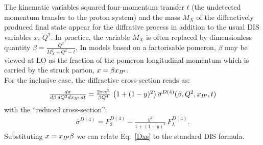 The kinematic variables squared four-momentum transfer $t$
(the undetected momentum transfer to the proton system) and
the mass $M_X$ of the diffractively produced final state 
appear for the diffrative process in addition to the usual DIS variables $x$, $Q^2$.
In practice, the variable $M_X$ 
is often replaced by dimensionless quantity $\beta=\frac{Q^2}{M_X^2+Q^2-t}$.
%
In models based on a factorisable pomeron, $\beta$ may be viewed at LO as the fraction of the
pomeron longitudinal momentum which is carried by the struck parton, $x=\beta x_{{I\!P}}$.
\\
For the inclusive case, the diffractive cross-section reads as:
\begin{equation}
\begin{array}{lcl}
  \frac{d\sigma}{d\beta\,dQ^2dx_{{I\!P}}\,dt}
=
  \frac{2\pi\alpha^2}{\beta Q^4}\,
    \left( 1 +  (1-y)^2 \right) \overline\sigma^{D(4)}(\beta,Q^2,x_{{I\!P}},t)
\label{Dxs}
\end{array}
\end{equation}
with the ``reduced cross-section'': 
\begin{equation}
\begin{array}{lcl}
\overline\sigma^{D(4)}
 = F_2^{D(4)} - \frac{y^2}{1 +  (1-y)^2}\, F_L^{D(4)}.
\label{eq:sigred}
\end{array}
\end{equation}
Substituting $x = x_{{I\!P}}\beta$ we can relate Eq.~\ref{Dxs} to the standard DIS formula.
